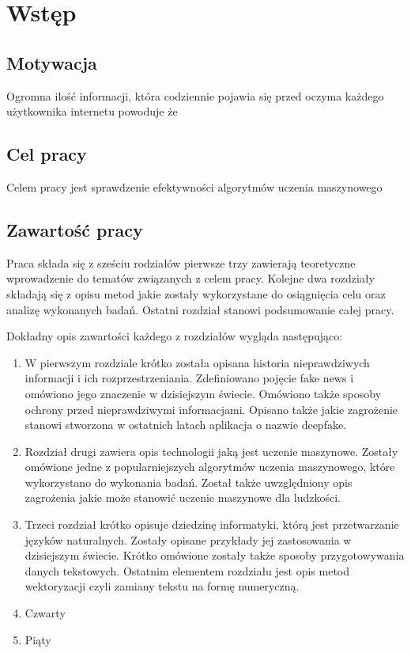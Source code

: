 \chapter*{Wstęp}
\section*{Motywacja}
Ogromna ilość informacji, która codziennie pojawia się przed oczyma każdego użytkownika internetu
powoduje że
\section*{Cel pracy}
Celem pracy jest sprawdzenie efektywności algorytmów uczenia maszynowego 
\section*{Zawartość pracy}
Praca składa się z sześciu rodziałów pierwsze trzy zawierają teoretyczne wprowadzenie 
do tematów związanych z celem pracy. Kolejne dwa rozdziały składają się z opisu metod jakie 
zostały wykorzystane do osiągnięcia celu oraz analizę wykonanych badań. Ostatni rozdział 
stanowi podsumowanie całej pracy.

Dokładny opis zawartości każdego z rozdziałów wygląda następująco:
\begin{enumerate}
    \item W pierwszym rozdziale krótko została opisana historia nieprawdziwych informacji 
    i ich rozprzestrzeniania. Zdefiniowano pojęcie fake news i omówiono jego znaczenie w
    dzisiejszym świecie. Omówiono także sposoby ochrony przed nieprawdziwymi informacjami.
    Opisano także jakie zagrożenie stanowi stworzona w ostatnich latach aplikacja o 
    nazwie deepfake.
    \item Rozdział drugi zawiera opis technologii jaką jest uczenie maszynowe. Zostały
    omówione jedne z popularniejszych algorytmów uczenia maszynowego, które wykorzystano
    do wykonania badań. Został także uwzględniony opis zagrożenia jakie może stanowić uczenie
    maszynowe dla ludzkości.
    \item Trzeci rozdział krótko opisuje dziedzinę informatyki, którą jest przetwarzanie 
    języków naturalnych. Zostały opisane przykłady jej zastosowania w dzisiejszym świecie.
    Krótko omówione zostały także sposoby przygotowywania danych tekstowych. Ostatnim elementem
    rozdziału jest opis metod wektoryzacji czyli zamiany tekstu na formę numeryczną. 
    \item Czwarty
    \item Piąty
\end{enumerate}